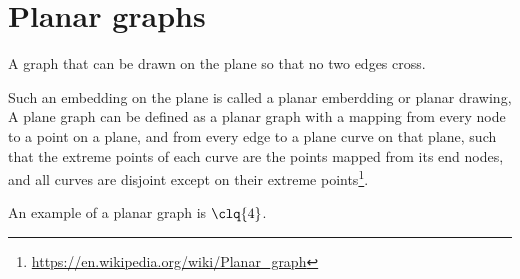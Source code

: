 \chapter{Planar graphs}
\begin{definition}
    A graph that can be drawn on the plane so that no two edges cross.
\end{definition}
Such an embedding on the plane is called a planar emberdding or planar drawing, A plane graph can be defined as a planar graph with a mapping from every node to a point on a plane, and from every edge to a plane curve on that plane, such that the extreme points of each curve are the points mapped from its end nodes, and all curves are disjoint except on their extreme points\footnote{\url{https://en.wikipedia.org/wiki/Planar_graph}}.

An example of a planar graph is $\clq{4}$.

